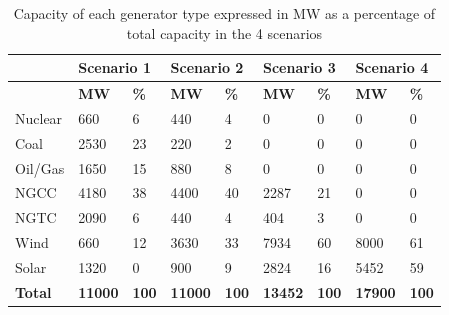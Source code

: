 \documentclass[12pt,LUDisStyle,twosided]{book}
\begin{document}
\begin{table}[H]
\centering
\caption{Capacity of each generator type expressed in MW as a percentage of total capacity in the 4 scenarios}
\begin{tabular}{|lllllll|l|l|}
\hline
               & \multicolumn{2}{l}{\textbf{Scenario 1}} & \multicolumn{2}{l}{\textbf{Scenario 2}} & \multicolumn{2}{l|}{\textbf{Scenario 3}} & \multicolumn{2}{l|}{\textbf{Scenario 4}} \\ \hline
               & \textbf{MW}         & \textbf{\%}       & \textbf{MW}         & \textbf{\%}       & \textbf{MW}          & \textbf{\%}       & \textbf{MW}          & \textbf{\%}       \\ \hline
Nuclear        & 660                 & 6                 & 440                 & 4                 & 0                    & 0                 & 0                    & 0                 \\ \hline
Coal           & 2530                & 23                & 220                 & 2                 & 0                    & 0                 & 0                    & 0                 \\ \hline
Oil/Gas        & 1650                & 15                & 880                 & 8                 & 0                    & 0                 & 0                    & 0                 \\ \hline
NGCC           & 4180                & 38                & 4400                & 40                & 2287                 & 21                & 0                    & 0                 \\ \hline
NGTC           & 2090                & 6                 & 440                 & 4                 & 404                  & 3                 & 0                    & 0                 \\ \hline
Wind           & 660                 & 12                & 3630                & 33                & 7934                 & 60                & 8000                 & 61                \\ \hline
Solar          & 1320                & 0                 & 900                 & 9                 & 2824                 & 16                & 5452                 & 59                \\ \hline
\textbf{Total} & \textbf{11000}      & \textbf{100}      & \textbf{11000}      & \textbf{100}      & \textbf{13452}       & \textbf{100}      & \textbf{17900}       & \textbf{100}      \\ \hline
\end{tabular}
\label{table:ScenarioDataDescription}
\end{table}
\end{document}
